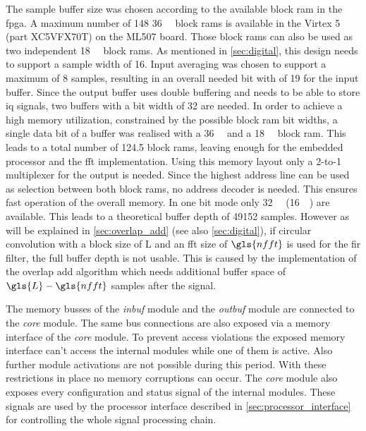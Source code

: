 \documentclass[12pt,a4paper,parskip=full,abstract=true,BCOR=12mm,twoside,open=right]{scrreprt}
\def\device#1{\mbox{\textit{#1}}}
\begin{document}
The sample buffer size was chosen according to the available block
\gls{ram} in the \gls{fpga}. A maximum number of 148 \SI{36}{\kilo\bit} block
\glspl{ram} is available in the Virtex 5 (part XC5VFX70T) on the ML507 board\cite{virtex5ds}. Those block \glspl{ram}
can also be used as two independent \SI{18}{\kilo\bit} block \glspl{ram}. As
mentioned in \cref{sec:digital}, this design needs to support a sample width
of \SI{16}{\bit}. Input averaging was chosen to support a maximum of 8 samples,
resulting in an overall needed bit with of \SI{19}{\bit} for the input buffer. Since
the output buffer uses double buffering and needs to be able to store \gls{iq} signals,
two buffers with a bit width of \SI{32}{\bit} are needed. In order to achieve a high memory utilization,
constrained by the possible block \gls{ram} bit widths, a single data bit of a buffer was
realised with a \SI{36}{\kilo\bit} and a \SI{18}{\kilo\bit} block \gls{ram}. This leads
to a total number of 124.5 block \glspl{ram}, leaving enough for the embedded processor
and the \gls{fft} implementation. Using this memory layout only a 2-to-1 multiplexer
for the output is needed. Since the highest address line can
be used as selection between both block \glspl{ram}, no address decoder is needed. This ensures fast operation of the
overall memory. In one bit mode only \SI{32}{\kilo\bit} (\SI{16}{\kilo\bit})
are available. This leads to a theoretical buffer depth of 49152 samples. However as
will be explained in \cref{sec:overlap_add} (see also \cref{sec:digital}), if circular convolution
with a block size of \gls{L} and an \gls{fft} size of $\gls{nfft}$ is used for the \gls{fir} filter,
the full buffer depth is not usable. This is caused by the implementation of the overlap add
algorithm which needs additional buffer space of $\gls{L} - \gls{nfft}$ samples after the signal.

The memory busses of the \device{inbuf} module and the \device{outbuf} module are
connected to the \device{core} module. The same bus connections are also exposed
via a memory interface of the \device{core} module. To prevent access violations
the exposed memory interface can't access the internal modules while one of
them is active. Also further module activations are not possible
during this period. With these restrictions in place no memory corruptions can
occur. The \device{core} module also exposes every configuration and status signal
of the internal modules. These signals are used by the processor interface described
in \cref{sec:processor_interface} for controlling the whole signal processing chain.
\end{document}
